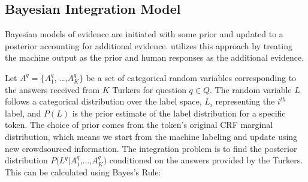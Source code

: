 
\subsection{Bayesian Integration Model}

Bayesian models of evidence are initiated with some prior and updated to a posterior accounting for additional evidence. \sysName utilizes this approach by treating the machine output as the prior and human responses as the additional evidence. 

Let $A^{q} = \{A^{q}_{1}$, \dots,$A^{q}_{K}\}$ be a set of categorical random variables corresponding to the answers received from $K$ Turkers for question $q \in Q$.  The random variable $L$ follows a categorical distribution over the label space, $L_{i}$ representing the $i^{th}$ label, and $P(L)$ is the prior estimate of the label distribution for a specific token.  The choice of prior comes from the token's original CRF marginal distribution, which means we start from the machine labeling and update using new crowdsourced information.  The integration problem is to find the posterior distribution $P(L^{q}|A^{q}_{1}$,...,$A^{q}_{K})$ conditioned on the answers provided by the Turkers.  This can be calculated using Bayes's Rule:     

